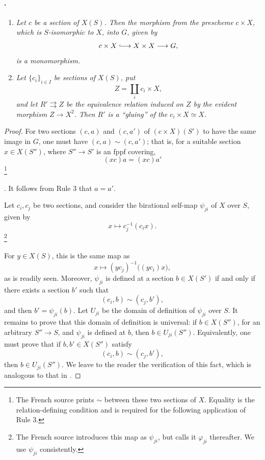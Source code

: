 \paragraph{.}
\begin{enumerate}
\item[\SGAInlineRefTarget{sga3:xviii:lemma:3.8:item:i}(i)] \textit{Let \(c\) be a section of \(X(S)\). Then the
morphism from the prescheme \(c\times X\), which is
\(S\)-isomorphic to \(X\), into \(G\), given by
\[
  c\times X\lhook\joinrel\longrightarrow X\times X
  \longrightarrow G,
\]
is a monomorphism.}

\item[\SGAInlineRefTarget{sga3:xviii:lemma:3.8:item:ii}(ii)] \textit{Let \(\{c_i\}_{i\in I}\) be sections of
\(X(S)\), put
\[
  Z=\coprod_i c_i\times X,
\]
and let \(R'\rightrightarrows Z\) be the equivalence relation
induced on \(Z\) by the evident morphism \(Z\to X^2\). Then
\(R'\) is a ``gluing'' of the \(c_i\times X\simeq X\).}
\end{enumerate}

\begin{proof}
\textup{} For two sections \((c,a)\) and \((c,a')\) of
\((c\times X)(S')\) to have the same image in \(G\), one must
have \((c,a)\sim(c,a')\); that is, for a suitable section
\(x\in X(S'')\), where \(S''\to S'\) is an fppf covering,
\[
  (xc)a=(xc)a'
\]
\begingroup
\renewcommand{\thefootnote}{\ensuremath{\dagger}}\footnote{The
French source prints \(\sim\) between these two sections of
\(X\). Equality is the relation-defining condition and is
required for the following application of Rule 3.}
\addtocounter{footnote}{-1}
\endgroup.
It follows from Rule 3 that \(a=a'\).

\textup{} Let \(c_i,c_j\) be two sections, and consider the
birational self-map \(\psi_{ji}\) of \(X\) over \(S\), given by
\[
  x\longmapsto c_j^{-1}(c_i x).
\]
\begingroup
\renewcommand{\thefootnote}{\ensuremath{\ddagger}}\footnote{The
French source introduces this map as \(\psi_{ji}\), but calls it
\(\varphi_{ji}\) thereafter. We use \(\psi_{ji}\) consistently.}
\addtocounter{footnote}{-1}
\endgroup
For \(y\in X(S)\), this is the same map as
\[
  x\longmapsto (yc_j)^{-1}\bigl((yc_i)x\bigr),
\]
as is readily seen. Moreover, \(\psi_{ji}\) is defined at a
section \(b\in X(S')\) if and only if there exists a section
\(b'\) such that
\[
  (c_i,b)\sim(c_j,b'),
\]
and then \(b'=\psi_{ji}(b)\). Let \(U_{ji}\) be the domain of
definition of \(\psi_{ji}\) over \(S\). It remains to prove that
this domain of definition is universal: if \(b\in X(S'')\), for
an arbitrary \(S''\to S\), and \(\psi_{ji}\) is defined at
\(b\), then \(b\in U_{ji}(S'')\). Equivalently, one must prove
that if \(b,b'\in X(S'')\) satisfy
\[
  (c_i,b)\sim(c_j,b'),
\]
then \(b\in U_{ji}(S'')\). We leave to the reader the
verification of this fact, which is analogous to that in .
\end{proof}

